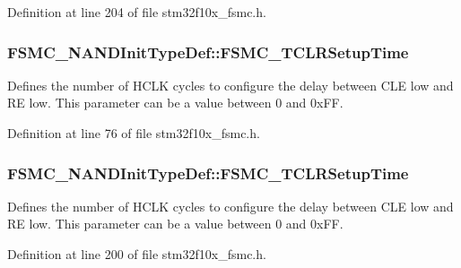 Definition at line 204 of file stm32f10x\+\_\+fsmc.\+h.

\subsubsection[{\texorpdfstring{F\+S\+M\+C\+\_\+\+T\+C\+L\+R\+Setup\+Time}{FSMC_TCLRSetupTime}}]{ F\+S\+M\+C\+\_\+\+N\+A\+N\+D\+Init\+Type\+Def\+::\+F\+S\+M\+C\+\_\+\+T\+C\+L\+R\+Setup\+Time}\hypertarget{struct_f_s_m_c___n_a_n_d_init_type_def_a094088666c8e4d51635b639d37dd9d44}{}\label{struct_f_s_m_c___n_a_n_d_init_type_def_a094088666c8e4d51635b639d37dd9d44}
Defines the number of H\+C\+LK cycles to configure the delay between C\+LE low and RE low. This parameter can be a value between 0 and 0x\+FF. 

Definition at line 76 of file stm32f10x\+\_\+fsmc.\+h.

\subsubsection[{\texorpdfstring{F\+S\+M\+C\+\_\+\+T\+C\+L\+R\+Setup\+Time}{FSMC_TCLRSetupTime}}]{ F\+S\+M\+C\+\_\+\+N\+A\+N\+D\+Init\+Type\+Def\+::\+F\+S\+M\+C\+\_\+\+T\+C\+L\+R\+Setup\+Time}\hypertarget{struct_f_s_m_c___n_a_n_d_init_type_def_a633c7be46a1d281916b9f2e34fa3d36a}{}\label{struct_f_s_m_c___n_a_n_d_init_type_def_a633c7be46a1d281916b9f2e34fa3d36a}
Defines the number of H\+C\+LK cycles to configure the delay between C\+LE low and RE low. This parameter can be a value between 0 and 0x\+FF. 

Definition at line 200 of file stm32f10x\+\_\+fsmc.\+h.

